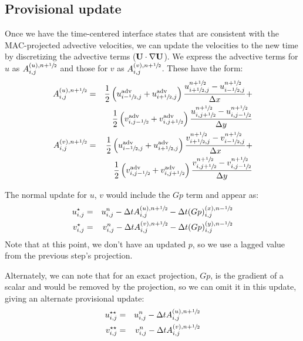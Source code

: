 \subsection{Provisional update}

Once we have the time-centered interface states that are consistent with
the MAC-projected advective velocities, we can update the velocities to
the new time by discretizing the advective terms (${\bf U}\cdot \nabla {\bf U}$).
We express the advective terms for $u$ as $A^{(u),n+{\sfrac{1}{2}}}_{i,j}$ and
those for $v$ as $A^{(v),n+{\sfrac{1}{2}}}_{i,j}$.  These have the form:
\begin{eqnarray}
A^{(u),n+\myhalf}_{i,j} =   
   && \frac{1}{2}
     \left ( u^\mathrm{adv}_{i-\myhalf,j} + u^\mathrm{adv}_{i+\myhalf,j} \right )
     \frac{u^{n+\myhalf}_{i+\myhalf,j} - u^{n+\myhalf}_{i-\myhalf,j}}{\Delta x} + \nonumber \\
   && \frac{1}{2}
     \left ( v^\mathrm{adv}_{i,j-\myhalf} + v^\mathrm{adv}_{i,j+\myhalf} \right )
     \frac{u^{n+\myhalf}_{i,j+\myhalf} - u^{n+\myhalf}_{i,j-\myhalf}}{\Delta y} \\
%
A^{(v),n+\myhalf}_{i,j} = 
   && \frac{1}{2}
     \left ( u^\mathrm{adv}_{i-\myhalf,j} + u^\mathrm{adv}_{i+\myhalf,j} \right )
     \frac{v^{n+\myhalf}_{i+\myhalf,j} - v^{n+\myhalf}_{i-\myhalf,j}}{\Delta x} \nonumber +\\
   && \frac{1}{2}
     \left ( v^\mathrm{adv}_{i,j-\myhalf} + v^\mathrm{adv}_{i,j+\myhalf} \right )
     \frac{v^{n+\myhalf}_{i,j+\myhalf} - v^{n+\myhalf}_{i,j-\myhalf}}{\Delta y}
\end{eqnarray}

The normal update for $u$, $v$ would include the $Gp$ term and appear
as:
\begin{eqnarray}
u^{\star}_{i,j} &=& u^n_{i,j} - \Delta t A^{(u),n+{\sfrac{1}{2}}}_{i,j} - \Delta t (G p)^{(x),n-{\sfrac{1}{2}}}_{i,j} \\
v^{\star}_{i,j} &=& v^n_{i,j} - \Delta t A^{(v),n+{\sfrac{1}{2}}}_{i,j} - \Delta t (G p)^{(y),n-{\sfrac{1}{2}}}_{i,j} 
\end{eqnarray}
Note that at this point, we don't have an updated $p$, so we use a lagged
value from the previous step's projection.

Alternately, we can note that for an exact projection, $Gp$, is the gradient
of a scalar and would be removed by the projection, so we can omit it in
this update, giving an alternate provisional update:
\begin{eqnarray}
u^{\star\star}_{i,j} &=& u^n_{i,j} - \Delta t A^{(u),n+{\sfrac{1}{2}}}_{i,j}  \\
v^{\star\star}_{i,j} &=& v^n_{i,j} - \Delta t A^{(v),n+{\sfrac{1}{2}}}_{i,j}  
\end{eqnarray}


